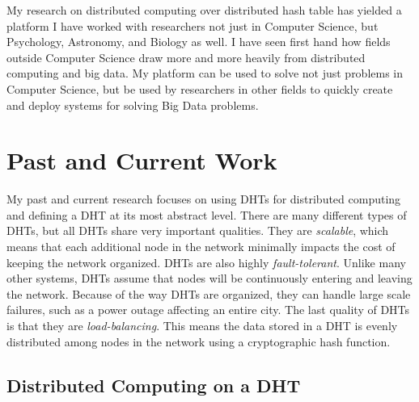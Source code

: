 \documentclass[letterpaper]{article}
\begin{document}
My research on distributed computing over distributed hash table has yielded a platform 
I have worked with researchers not just in Computer Science, but Psychology, Astronomy, and Biology as well.
I have seen first hand how fields outside Computer Science draw more and more heavily from distributed computing and big data.
My platform can be used to solve not just problems in Computer Science, but be used by researchers in other fields to quickly create and deploy systems for solving Big Data problems.

%
%

%
%
%

\section{Past and Current Work}

My past and current research focuses on using DHTs for distributed computing \cite{chordreduce} and defining a DHT at its most abstract level.
There are many different types of DHTs, but all DHTs share very important qualities.
They are \textit{scalable}, which means that each additional node in the network minimally impacts the cost of keeping the network organized.
DHTs are also highly \textit{fault-tolerant}.
Unlike many other systems, DHTs assume that nodes will be continuously entering and leaving the network.
Because of the way DHTs are organized, they can handle large scale failures, such as a power outage affecting an entire city.
The last quality of DHTs is that they are \textit{load-balancing}. 
This means the data stored in a DHT is evenly distributed among nodes in the network using a cryptographic hash function.


\subsection{Distributed Computing on a DHT}
\end{document}
